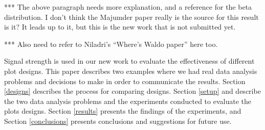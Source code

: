 *** The above paragraph needs more explanation, and a reference for the beta distribution. I don't think the Majumder paper really is the source for this result is it? It leads up to it, but this is the new work that is not submitted yet.

*** Also need to refer to Niladri's ``Where's Waldo paper'' here too.



 
Signal strength is used in our new work to evaluate the effectiveness of different plot designs. This paper describes two examples where we had real data analysis problems and decisions to make in order to communicate the results. Section \ref{designs} describes the process for comparing designs. Section \ref{setup} and describe the two data analysis problems and the experiments conducted to evaluate the plots designs. Section \ref{results} presents the findings of the experiments, and Section \ref{conclusions} presents conclusions and suggestions for future use.

